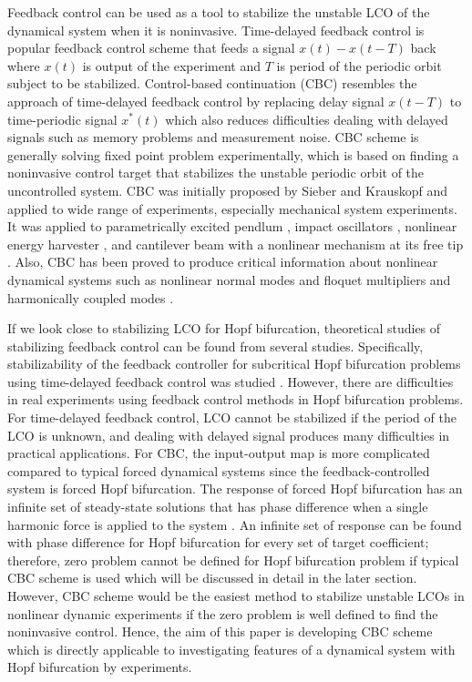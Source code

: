 \documentclass[openacc]{rsproca_new}%
\begin{document}
Feedback control can be used as a tool to stabilize the unstable LCO of the dynamical system when it is noninvasive. Time-delayed feedback control \cite{pyragas2006delayed,sieber2016generic} is popular feedback control scheme that feeds a signal $x(t)-x(t-T)$ back where $x(t)$ is output of the experiment and $T$ is period of the periodic orbit subject to be stabilized. Control-based continuation (CBC) resembles the approach of time-delayed feedback control by replacing delay signal $x(t-T)$ to time-periodic signal $x^*(t)$ which also reduces difficulties dealing with delayed signals such as memory problems and measurement noise. CBC scheme is generally solving fixed point problem experimentally, which is based on finding a noninvasive control target that stabilizes the unstable periodic orbit of the uncontrolled system. CBC was initially proposed by Sieber and Krauskopf \cite{sieber2008control} and applied to wide range of experiments, especially mechanical system experiments. It was applied to parametrically excited pendlum \cite{sieber2011control}, impact oscillators \cite{bureau2013experimental,bureau2014experimental}, nonlinear energy harvester \cite{barton2013systematic,barton2011numerical}
, and cantilever beam with a nonlinear mechanism at its free tip \cite{renson2019application}. Also, CBC has been proved to produce critical information about nonlinear dynamical systems such as nonlinear normal modes \cite{renson2016robust,renson2016experimental} and floquet multipliers \cite{barton2017control} and harmonically coupled modes \cite{renson2019application}.

If we look close to stabilizing LCO for Hopf bifurcation, theoretical studies of stabilizing feedback control can be found from several studies. Specifically, stabilizability of the feedback controller for subcritical Hopf bifurcation problems using time-delayed feedback control was studied \cite{brown2011time,postlethwaite2013feedback}. However, there are difficulties in real experiments using feedback control methods in Hopf bifurcation problems. For time-delayed feedback control, LCO cannot be stabilized if the period of the LCO is unknown, and dealing with delayed signal produces many difficulties in practical applications. For CBC, the input-output map is more complicated compared to typical forced dynamical systems since the feedback-controlled system is forced Hopf bifurcation. The response of forced Hopf bifurcation has an infinite set of steady-state solutions that has phase difference when a single harmonic force is applied to the system \cite{golubitsky2009feed}. An infinite set of response can be found with phase difference for Hopf bifurcation for every set of target coefficient; therefore, zero problem cannot be defined for Hopf bifurcation problem if typical CBC scheme is used which will be discussed in detail in the later section. However, CBC scheme would be the easiest method to stabilize unstable LCOs in nonlinear dynamic experiments if the zero problem is well defined to find the noninvasive control. Hence, the aim of this paper is developing CBC scheme which is directly applicable to investigating features of a dynamical system with Hopf bifurcation by experiments.
\end{document}
